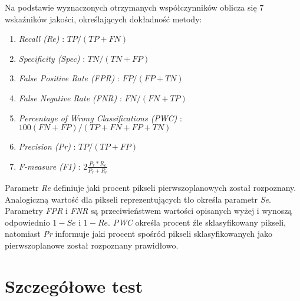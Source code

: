 \noindent Na podstawie wyznaczonych otrzymanych współczynników oblicza się 7 wskaźników jakości, określających dokładność metody:
%
\begin{enumerate}[nolistsep]
	\item \textit{Recall (Re)} : \tab \small{$TP/(TP+FN)$}
	\item \textit{Specificity (Spec)} : \tab \small{$TN/(TN+FP)$}
	\item \textit{False Positive Rate (FPR)} : \tab \small{$FP/(FP + TN)$}
	\item \textit{False Negative Rate (FNR)} : \tab \small{$FN/(FN + TP)$}
	\item \textit{Percentage of Wrong Classifications (PWC)} : \tab \small{$100(FN + FP)/(TP + FN + FP + TN)$}
	\item \textit{Precision (Pr)} : \tab \small{$TP/(TP + FP)$}
	\item \textit{F-measure (F1)} : \tab \small{$2\frac{P_r*R_e}{P_r+R_r}$}\\
\end{enumerate}

Parametr \textit{Re} definiuje jaki procent pikseli pierwszoplanowych został rozpoznany. Analogiczną wartość dla pikseli reprezentujących tło określa parametr \textit{Se}. Parametry \textit{FPR} i \textit{FNR} są przeciwieństwem wartości opisanych wyżej i wynoszą odpowiednio $1-Se$ i $1-Re$. \textit{PWC} określa procent źle sklasyfikowany pikseli, natomiast \textit{Pr} informuje jaki procent spośród pikseli sklasyfikowanych jako pierwszoplanowe został rozpoznany prawidłowo.

\section{Szczegółowe test}
\label{sec:testy}